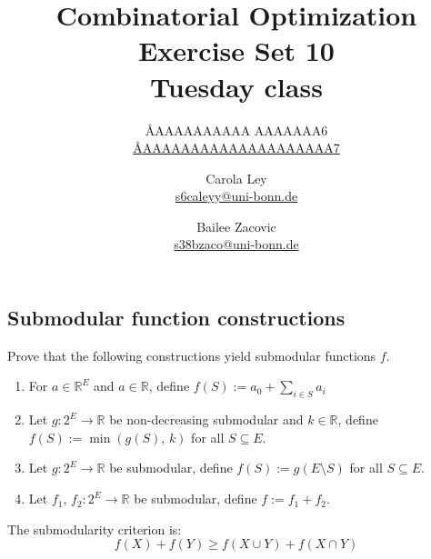 \documentclass{article}
\title{Combinatorial Optimization \\ Exercise Set 10 \\ Tuesday class}
\author{
  \AA{AAAAAAAAAA AAAAAAA}{6} \\
  \href{mailto:\AA{AAAAAAAAAAAAAAAAAAAA}{7}}{\AA{AAAAAAAAAAAAAAAAAAAA}{7}}
  \and
  Carola Ley \\
  \href{mailto:s6caleyy@uni-bonn.de}{s6caleyy@uni-bonn.de}
  \and
  Bailee Zacovic \\
  \href{mailto:s38bzaco@uni-bonn.de}{s38bzaco@uni-bonn.de}
}
\newcommand{\R}{\mathbb{R}}
\begin{document}
  \maketitle

  \setcounter{section}{10}
  \subsection{Submodular function constructions}
  \begin{centerframebox}
    Prove that the following constructions yield submodular functions $f$.

    \begin{enumerate}[label=(\roman*)]
      \item For $a \in \R^E$ and $a \in \R$, define $f(S) := a_0 + \sum_{i\in S} a_i$
      \item Let $g: 2^E \to \R$ be non-decreasing submodular and $k \in \R$, define $f(S) := \min(g(S),\, k)$ for all $S \subseteq E$.
      \item Let $g: 2^E \to \R$ be submodular, define $f(S) := g(E \setminus S)$ for all $S \subseteq E$.
      \item Let $f_1,\, f_2 : 2^E \to \R$ be submodular, define $f := f_1 + f_2$.
    \end{enumerate}
  \end{centerframebox}
  The submodularity criterion is:
  \[ f(X) + f(Y) \geq f(X \cup Y) + f(X \cap Y) \]
\end{document}
